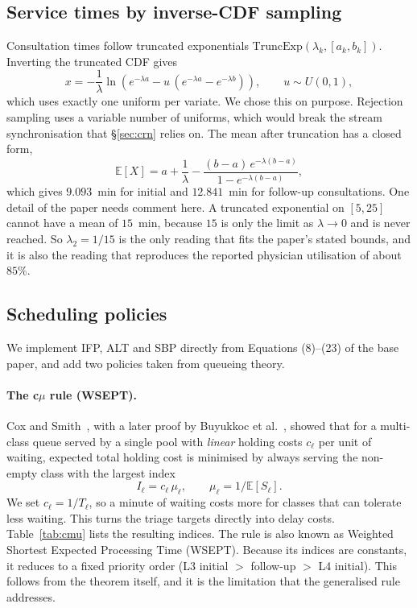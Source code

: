 \documentclass[sigconf,nonacm]{acmart}
\begin{document}
\subsection{Service times by inverse-CDF sampling}
Consultation times follow truncated exponentials $\mathrm{TruncExp}(\lambda_k,
[a_k,b_k])$. Inverting the truncated CDF gives
\begin{equation}
x = -\frac{1}{\lambda}
    \ln\!\left( e^{-\lambda a} - u\,(e^{-\lambda a}-e^{-\lambda b}) \right),
\qquad u\sim U(0,1),
\label{eq:truncexp}
\end{equation}
which uses exactly one uniform per variate. We chose this on purpose.
Rejection sampling uses a variable number of uniforms, which would break the
stream synchronisation that \S\ref{sec:crn} relies on. The mean after
truncation has a closed form,
\begin{equation}
\mathbb{E}[X] = a + \frac{1}{\lambda}
  - \frac{(b-a)\,e^{-\lambda(b-a)}}{1-e^{-\lambda(b-a)}} ,
\label{eq:truncmean}
\end{equation}
which gives $9.093$~min for initial and $12.841$~min for follow-up
consultations. One detail of the paper needs comment here. A truncated
exponential on $[5,25]$ cannot have a mean of $15$~min, because $15$ is only
the limit as $\lambda\to0$ and is never reached. So $\lambda_2=1/15$ is the
only reading that fits the paper's stated bounds, and it is also the reading
that reproduces the reported physician utilisation of about $85\%$.

\subsection{Scheduling policies}
\label{sec:cmu}
We implement IFP, ALT and SBP directly from Equations (8)--(23) of the base
paper, and add two policies taken from queueing theory.

\paragraph{The c$\mu$ rule (WSEPT).}
Cox and Smith~\cite{cox1961queues}, with a later proof by Buyukkoc et
al.~\cite{buyukkoc1985cmu}, showed that for a multi-class queue served by a
single pool with \emph{linear} holding costs $c_\ell$ per unit of waiting,
expected total holding cost is minimised by always serving the non-empty class
with the largest index
\begin{equation}
I_\ell = c_\ell\,\mu_\ell ,
\qquad \mu_\ell = 1/\mathbb{E}[S_\ell] .
\label{eq:cmu}
\end{equation}
We set $c_\ell = 1/T_\ell$, so a minute of waiting costs more for classes that
can tolerate less waiting. This turns the triage targets directly into delay
costs. Table~\ref{tab:cmu} lists the resulting indices. The rule is also known
as Weighted Shortest Expected Processing Time (WSEPT). Because its indices are
constants, it reduces to a fixed priority order (L3 initial $>$ follow-up $>$
L4 initial). This follows from the theorem itself, and it is the limitation
that the generalised rule addresses.
\end{document}
